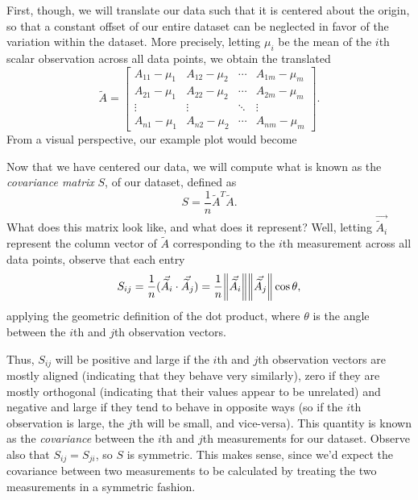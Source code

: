 \documentclass[letterpaper]{article}
\theoremstyle{remark}
\renewcommand{\tilde}[1]{\widetilde{#1}}
\newcommand{\mat}[1]{\ensuremath{\begin{bmatrix}#1\end{bmatrix}}}
\begin{document}
First, though, we will translate our data such that it is centered about the origin, so that a constant offset of our entire dataset can be neglected in favor of the variation within the dataset. More precisely, letting $\mu_i$ be the mean of the $i$th scalar observation across all data points, we obtain the translated
\[
    \tilde{A} = \mat{A_{11} - \mu_1 & A_{12} - \mu_2 & \cdots & A_{1m} - \mu_m \\ A_{21} - \mu_1 & A_{22} - \mu_2 & \cdots & A_{2m} - \mu_m \\ \vdots & \vdots & \ddots & \vdots \\ A_{n1} - \mu_1 & A_{n2} - \mu_2 & \cdots & A_{nm} - \mu_m}.
\]
From a visual perspective, our example plot would become
\begin{center}
\end{center}

Now that we have centered our data, we will compute what is known as the \emph{covariance matrix} $S$, of our dataset, defined as
\[
    S = \frac{1}{n} \tilde{A}^T\tilde{A}.
\]
What does this matrix look like, and what does it represent? Well, letting $\vec{\tilde{A}_i}$ represent the column vector of $\tilde{A}$ corresponding to the $i$th measurement across all data points, observe that each entry
\[
    S_{ij} = \frac{1}{n} (\vec{\tilde{A}_i} \cdot \vec{\tilde{A}_j}) = \frac{1}{n}\norm{\vec{\tilde{A}_i}}\norm{\vec{\tilde{A}_j}}\cos{\theta},
\]
applying the geometric definition of the dot product, where $\theta$ is the angle between the $i$th and $j$th observation vectors.

Thus, $S_{ij}$ will be positive and large if the $i$th and $j$th observation vectors are mostly aligned (indicating that they behave very similarly), zero if they are mostly orthogonal (indicating that their values appear to be unrelated) and negative and large if they tend to behave in opposite ways (so if the $i$th observation is large, the $j$th will be small, and vice-versa). This quantity is known as the \emph{covariance} between the $i$th and $j$th measurements for our dataset. Observe also that $S_{ij} = S_{ji}$, so $S$ is symmetric. This makes sense, since we'd expect the covariance between two measurements to be calculated by treating the two measurements in a symmetric fashion.
\end{document}
